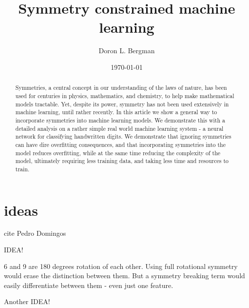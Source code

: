 \documentclass[twocolumn, prl]{revtex4-1}
\begin{document}
\newcommand{\trp}{^{\scriptsize \text{T}}}
\newcommand{\itp}{^{\scriptsize -\text{T}}}
\newcommand{\sqrtp}{^{\scriptsize \text{T/2}}}
\newcommand{\isqrtp}{^{\scriptsize -\text{T/2}}}
\newcommand{\inv}{^{\scriptsize -1}}
\newcommand{\sqr}{^{\scriptsize \text{1/2}}}
\newcommand{\invsqr}{^{\scriptsize -\text{1/2}}}

\newcommand{\be}{\begin{equation}}
\newcommand{\ee}{\end{equation}}


\title{Symmetry constrained machine learning}
\date{\today}

\author{Doron L. Bergman}

\begin{abstract}
Symmetries, a central concept in our understanding of the laws of nature, has been used for centuries in 
physics, mathematics, and chemistry, to help make mathematical models tractable. Yet, despite its power, symmetry has not been used extensively in machine learning, until rather recently. In this article we show a general way to incorporate symmetries into machine learning models. We demonstrate this with a detailed analysis on a rather simple real world machine learning system - a neural network for classifying handwritten digits. We demonstrate that ignoring symmetries can have dire overfitting consequences, and that incorporating symmetries into the model reduces overfitting, while at the same time reducing the complexity of the model, ultimately requiring less training data, and taking less time and resources to train.
\end{abstract}

\maketitle


\section{ideas}
\label{Sec:Ideas}


cite Pedro Domingos

IDEA!

6 and 9 are 180 degrees rotation of each other. Using full rotational symmetry would erase the distinction between them. But a symmetry breaking term would easily differentiate between them - even just one feature.

Another IDEA!
\end{document}
